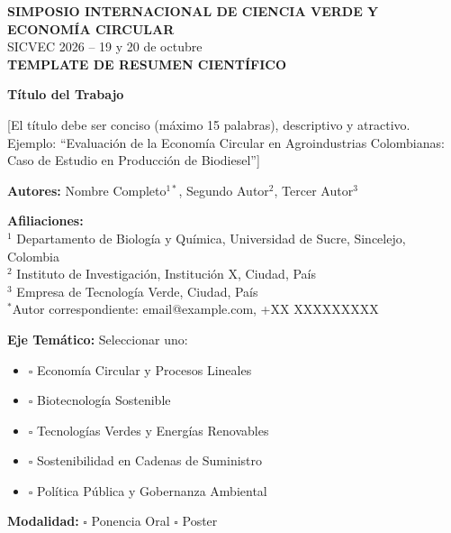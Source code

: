 \documentclass[12pt,a4paper]{article}
\begin{document}

\thispagestyle{empty}

\begin{center}
{\Large\bfseries\color{verdeosc} SIMPOSIO INTERNACIONAL DE CIENCIA VERDE Y ECONOMÍA CIRCULAR}\\
{\normalsize\color{verdemid} SICVEC 2026 -- 19 y 20 de octubre}\\[1cm]
{\Large\bfseries\color{verdeosc} TEMPLATE DE RESUMEN CIENTÍFICO}\\
\end{center}

\vspace{1cm}

\noindent
\begin{tcolorbox}[enhanced, colback=verdeclaro, colframe=verdeosc, boxrule=1.5pt, left=10pt, right=10pt, top=10pt, bottom=10pt]

\noindent
\textbf{\Large Título del Trabajo}

[El título debe ser conciso (máximo 15 palabras), descriptivo y atractivo.\\
Ejemplo: ``Evaluación de la Economía Circular en Agroindustrias Colombianas: Caso de Estudio en Producción de Biodiesel'']

\vspace{0.5cm}

\noindent
\textbf{Autores:} Nombre Completo$^{1*}$, Segundo Autor$^{2}$, Tercer Autor$^{3}$

\noindent
\textbf{Afiliaciones:}\\
$^{1}$ Departamento de Biología y Química, Universidad de Sucre, Sincelejo, Colombia\\
$^{2}$ Instituto de Investigación, Institución X, Ciudad, País\\
$^{3}$ Empresa de Tecnología Verde, Ciudad, País\\
$^{*}$Autor correspondiente: email@example.com, +XX XXXXXXXXX

\vspace{0.5cm}

\noindent
\textbf{Eje Temático:} Seleccionar uno:
\begin{itemize}
  \item $\square$ Economía Circular y Procesos Lineales
  \item $\square$ Biotecnología Sostenible
  \item $\square$ Tecnologías Verdes y Energías Renovables
  \item $\square$ Sostenibilidad en Cadenas de Suministro
  \item $\square$ Política Pública y Gobernanza Ambiental
\end{itemize}

\noindent
\textbf{Modalidad:} $\square$ Ponencia Oral \quad $\square$ Poster

\end{tcolorbox}
\end{document}
